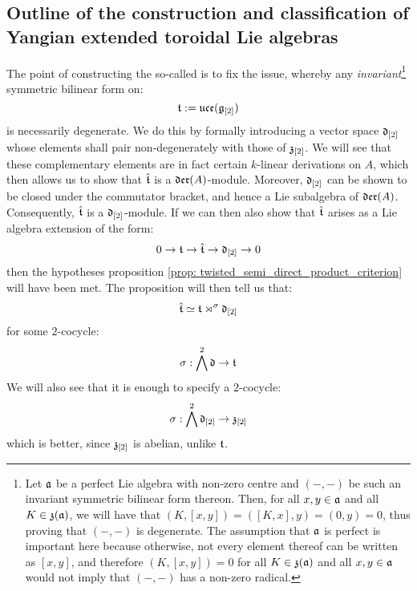     \subsection{Outline of the construction and classification of Yangian extended toroidal Lie algebras}
        The point of constructing the so-called  is to fix the issue, whereby any \textit{invariant}\footnote{Let $\mathfrak{a}$ be a perfect Lie algebra with non-zero centre and $(-, -)$ be such an invariant symmetric bilinear form thereon. Then, for all $x, y \in \mathfrak{a}$ and all $K \in \mathfrak{z}(\mathfrak{a})$, we will have that $(K, [x, y]) = ([K, x], y) = (0, y) = 0$, thus proving that $(-, -)$ is degenerate. The assumption that $\mathfrak{a}$ is perfect is important here because otherwise, not every element thereof can be written as $[x, y]$, and therefore $(K, [x, y]) = 0$ for all $K \in \mathfrak{z}(\mathfrak{a})$ and all $x, y \in \mathfrak{a}$ would not imply that $(-, -)$ has a non-zero radical.} symmetric bilinear form on:
            $$\mathfrak{t}:= \mathfrak{uce}(\mathfrak{g}_{[2]})$$
        is necessarily degenerate. We do this by formally introducing a  vector space $\mathfrak{d}_{[2]}$ whose elements shall pair non-degenerately with those of $\mathfrak{z}_{[2]}$. We will see that these complementary elements are in fact certain $k$-linear derivations on $A$, which then allows us to show that $\hat{\mathfrak{t}}$ is a $\mathfrak{der}(A)$-module. Moreover, $\mathfrak{d}_{[2]}$ can be shown to be closed under the commutator bracket, and hence a Lie subalgebra of $\mathfrak{der}(A)$. Consequently, $\hat{\mathfrak{t}}$ is a $\mathfrak{d}_{[2]}$-module. If we can then also show that $\hat{\mathfrak{t}}$ arises as a Lie algebra extension of the form:
            $$0 \to \mathfrak{t} \to \hat{\mathfrak{t}} \to \mathfrak{d}_{[2]} \to 0$$
        then the hypotheses proposition \ref{prop: twisted_semi_direct_product_criterion} will have been met. The proposition will then tell us that:
            $$\hat{\mathfrak{t}} \simeq \mathfrak{t} \rtimes^{\sigma} \mathfrak{d}_{[2]}$$
        for some $2$-cocycle:
            $$\sigma: \bigwedge^2 \mathfrak{d} \to \mathfrak{t}$$
        We will also see that it is enough to specify a $2$-cocycle:
            $$\sigma: \bigwedge^2 \mathfrak{d}_{[2]} \to \mathfrak{z}_{[2]}$$
        which is better, since $\mathfrak{z}_{[2]}$ is abelian, unlike $\mathfrak{t}$.
        
